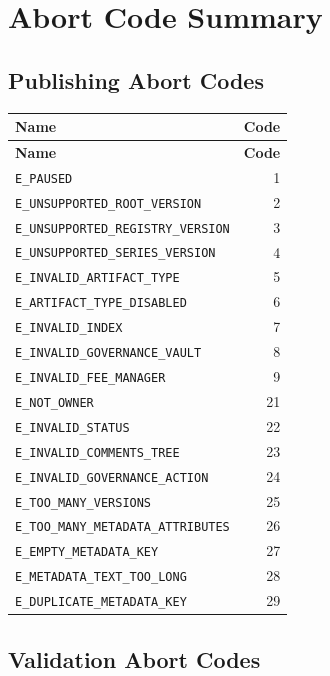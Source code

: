 \documentclass[11pt]{article}
\newcommand{\code}[1]{\texttt{#1}}
\begin{document}
\section{Abort Code Summary}

\subsection{Publishing Abort Codes}

\begin{longtable}{lr}
\toprule
\textbf{Name} & \textbf{Code} \\
\midrule
\endfirsthead
\toprule
\textbf{Name} & \textbf{Code} \\
\midrule
\endhead
\code{E\_PAUSED} & 1 \\
\code{E\_UNSUPPORTED\_ROOT\_VERSION} & 2 \\
\code{E\_UNSUPPORTED\_REGISTRY\_VERSION} & 3 \\
\code{E\_UNSUPPORTED\_SERIES\_VERSION} & 4 \\
\code{E\_INVALID\_ARTIFACT\_TYPE} & 5 \\
\code{E\_ARTIFACT\_TYPE\_DISABLED} & 6 \\
\code{E\_INVALID\_INDEX} & 7 \\
\code{E\_INVALID\_GOVERNANCE\_VAULT} & 8 \\
\code{E\_INVALID\_FEE\_MANAGER} & 9 \\
\code{E\_NOT\_OWNER} & 21 \\
\code{E\_INVALID\_STATUS} & 22 \\
\code{E\_INVALID\_COMMENTS\_TREE} & 23 \\
\code{E\_INVALID\_GOVERNANCE\_ACTION} & 24 \\
\code{E\_TOO\_MANY\_VERSIONS} & 25 \\
\code{E\_TOO\_MANY\_METADATA\_ATTRIBUTES} & 26 \\
\code{E\_EMPTY\_METADATA\_KEY} & 27 \\
\code{E\_METADATA\_TEXT\_TOO\_LONG} & 28 \\
\code{E\_DUPLICATE\_METADATA\_KEY} & 29 \\
\bottomrule
\end{longtable}

\subsection{Validation Abort Codes}
\end{document}
